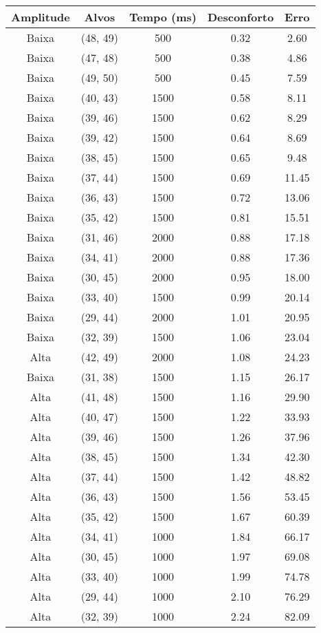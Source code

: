 \begin{tabular}{c c c c c}
\hline
Amplitude & Alvos & Tempo (ms) & Desconforto & Erro \\
\hline
Baixa & (48, 49) &  500 & 0.32 & 2.60 \\
Baixa & (47, 48) &  500 & 0.38 & 4.86 \\
Baixa & (49, 50) &  500 & 0.45 & 7.59 \\
Baixa & (40, 43) &  1500 & 0.58 & 8.11 \\
Baixa & (39, 46) &  1500 & 0.62 & 8.29 \\
Baixa & (39, 42) &  1500 & 0.64 & 8.69 \\
Baixa & (38, 45) &  1500 & 0.65 & 9.48 \\
Baixa & (37, 44) &  1500 & 0.69 & 11.45 \\
Baixa & (36, 43) &  1500 & 0.72 & 13.06 \\
Baixa & (35, 42) &  1500 & 0.81 & 15.51 \\
Baixa & (31, 46) &  2000 & 0.88 & 17.18 \\
Baixa & (34, 41) &  2000 & 0.88 & 17.36 \\
Baixa & (30, 45) &  2000 & 0.95 & 18.00 \\
Baixa & (33, 40) &  1500 & 0.99 & 20.14 \\
Baixa & (29, 44) &  2000 & 1.01 & 20.95 \\
Baixa & (32, 39) &  1500 & 1.06 & 23.04 \\
Alta & (42, 49) &  2000 & 1.08 & 24.23 \\
Baixa & (31, 38) &  1500 & 1.15 & 26.17 \\
Alta & (41, 48) &  1500 & 1.16 & 29.90 \\
Alta & (40, 47) &  1500 & 1.22 & 33.93 \\
Alta & (39, 46) &  1500 & 1.26 & 37.96 \\
Alta & (38, 45) &  1500 & 1.34 & 42.30 \\
Alta & (37, 44) &  1500 & 1.42 & 48.82 \\
Alta & (36, 43) &  1500 & 1.56 & 53.45 \\
Alta & (35, 42) &  1500 & 1.67 & 60.39 \\
Alta & (34, 41) &  1000 & 1.84 & 66.17 \\
Alta & (30, 45) &  1000 & 1.97 & 69.08 \\
Alta & (33, 40) &  1000 & 1.99 & 74.78 \\
Alta & (29, 44) &  1000 & 2.10 & 76.29 \\
Alta & (32, 39) &  1000 & 2.24 & 82.09 \\

\end{tabular}

